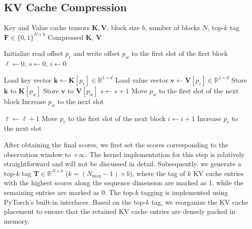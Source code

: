 \documentclass[11pt]{article}
\begin{document}
\subsection{KV Cache Compression}
\label{sct:compression}



\begin{algorithm}[!h]
\caption{KV Cache Compression}
\label{alg:compress}
\label{alg:kv-compression}
\begin{algorithmic}[1]
\Require Key and Value cache tensors $\mathbf{K}, \mathbf{V} $, block size $b$, number of blocks $N$, top-$k$ tag $\mathbf{F} \in \{0, 1\}^{N \times b}$
\Ensure Compressed $\mathbf{K}$, $\mathbf{V}$

\State Initialize read offset $p_{r}$ and write offset $p_{w}$ to the first slot of the first block
\State $\ell \gets 0$, $s \gets 0$, $i \gets 0$

        \State Load key vector $\mathbf{k} \leftarrow\mathbf{ K}[p_{r}] \in \mathbb{R}^{1 \times d}$
        \State Load value vector $\mathbf{v} \leftarrow \mathbf{V}[p_{r}] \in \mathbb{R}^{1 \times d}$
        \State Store $\mathbf{k}$ to $\mathbf{K}[p_{w}]$
        \State Store $\mathbf{v}$ to $\mathbf{V}[p_{w}]$
        \State $s \gets s + 1$
            \State Move $p_{w}$ to the first slot of the next block
        \Else
            \State Increase $p_{w}$ to the next slot
        \EndIf
    \EndIf

    \State $\ell \gets \ell + 1$
        \State Move $p_{r}$ to the first slot of the next block
        \State $i \gets i + 1$
    \Else
        \State Increase $p_{r}$ to the next slot
    \EndIf
\EndWhile
\end{algorithmic}
\end{algorithm}

After obtaining the final scores, we first set the scores corresponding to the observation window to $+\infty$. The kernel implementation for this step is relatively straightforward and will not be discussed in detail. Subsequently, we generate a top-$k$ tag $\mathbf{T} \in \mathbb{R}^{N \times b}$ ($k=(N_{\max}-1)\times b$), where the tag of $k$ KV cache entries with the highest scores along the sequence dimension are marked as 1, while the remaining entries are marked as 0. The top-$k$ tagging is implemented using PyTorch's built-in interfaces. Based on the top-$k$ tag, we reorganize the KV cache placement to ensure that the retained KV cache entries are densely packed in memory.
\end{document}
